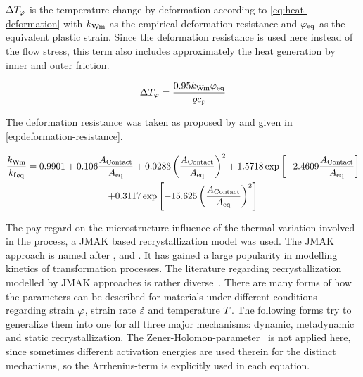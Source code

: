 \noindent$\Delta{T}_{{\varphi}}$ is the temperature change by deformation according to \autoref{eq:heat-deformation} with ${k_\mathrm{Wm}}$ as the empirical deformation resistance and ${{{\varphi}}_\mathrm{eq}}$ as the equivalent plastic strain.
Since the deformation resistance is used here instead of the flow stress, this term also includes approximately the heat generation by inner and outer friction.

\begin{equation}
    \Delta{T}_{{\varphi}} = \frac{\num{0.95} {k_\mathrm{Wm}} {{{\varphi}}_\mathrm{eq}}}{{\varrho}{c_\mathrm{p}}}
    \label{eq:heat-deformation}
\end{equation}

The deformation resistance was taken as proposed by \textcite{Hensel1978} and given in \autoref{eq:deformation-resistance}.

\begin{multline}
    \frac{{k_\mathrm{Wm}}}{{{{k_\mathrm{f}}}_\mathrm{eq}}} = \num{0.9901} + \num{0.106} \frac{{{A}_\mathrm{Contact}}}{{{{A}}_\mathrm{eq}}} + \num{0.0283} \left( \frac{{{A}_\mathrm{Contact}}}{{{{A}}_\mathrm{eq}}} \right)^2 + \num{1.5718} \exp \left[ \num{-2.4609} \frac{{{A}_\mathrm{Contact}}}{{{{A}}_\mathrm{eq}}} \right] \\
    + \num{0.3117} \exp \left[ \num{-15.625} \left( \frac{{{A}_\mathrm{Contact}}}{{{{A}}_\mathrm{eq}}} \right)^2 \right]
    \label{eq:deformation-resistance}
\end{multline}

The pay regard on the microstructure influence of the thermal variation involved in the process, a JMAK based recrystallization model was used.
The JMAK approach is named after \textcite{Johnson1939}, \textcite{Avrami1939, Avrami1940, Avrami1941} and \textcite{Kolmogorov1937}.
It has gained a large popularity in modelling kinetics of transformation processes.
The literature regarding recrystallization modelled by JMAK approaches is rather diverse~\cite{Luton1969, Sellars1978, Sellars1979, Sellars1985, Beynon1992, Glover1972, Glover1973, Hodgson1992, Laasraoui1991, Laasraoui1991a, Hernandez1996, Medina1996, Fernandez2000, Fernandez2003, Karhausen1992,Roberts1979, Maccagno1996, Siciliano2000}.
There are many forms of how the parameters can be described for materials under different conditions regarding strain ${\varphi}$, strain rate ${\dot{\varepsilon}}$ and temperature ${T}$.
The following forms try to generalize them into one for all three major mechanisms: dynamic, metadynamic and static recrystallization.
The Zener-Holomon-parameter~\cite{Zener1944} is not applied here, since sometimes different activation energies are used therein for the distinct mechanisms, so the Arrhenius-term is explicitly used in each equation.

